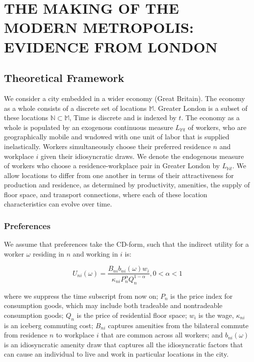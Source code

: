 \chapter{THE MAKING OF THE MODERN METROPOLIS: EVIDENCE FROM LONDON}

\section{Theoretical Framework}

We consider a city embedded in a wider economy (Great Britain). The economy as a whole consists of a discrete set of locations $\mathbb{M}$. Greater London is a subset of these locations $\mathbb{N} \subset \mathbb{M}$, Time is discrete and is indexed by $t$. The economy as a whole is populated by an exogenous continuous measure $L_{\mathbb{M}t}$ of workers, who are geographically mobile and wndowed with one unit of labor that is supplied inelastically. Workers simultaneously choose their preferred residence $n$ and workplace $i$ given their idiosyncratic draws. We denote the endogenous measure of workers who choose a residence-workplace pair in Greater London by $L_{\mathbb{N}t}$. We allow locations to differ from one another in terms of their attractiveness for production and residence, as determined by productivity, amenities, the supply of floor space, and transport connections, where each of these location characteristics can evolve over time.

\subsection{Preferences}

We assume that preferences take the CD-form, such that the indirect utility for a worker $\omega$ residing in $n$ and working in $i$ is:

\begin{equation}
    U_{ni}(\omega) = \frac{B_{ni}b_{ni}(\omega)w_i}{\kappa_{ni}P_n^{\alpha} Q_n^{1 - \alpha}}, 0 < \alpha < 1
\end{equation}

where we suppress the time subscript from now on; $P_n$ is the price index for consumption goods, which may include both tradeable and nontradeable consumption goods; $Q_n$ is the price of residential floor space; $w_i$ is the wage, $\kappa_{ni}$ is an iceberg commuting cost; $B_{ni}$ captures amenities from the bilateral commute from residence $n$ to workplace $i$ that are common across all workers; and $b_{ni}(\omega)$ is an idiosyncratic amenity draw that captures all the idiosyncratic factors that can cause an individual to live and work in particular locations in the city.

